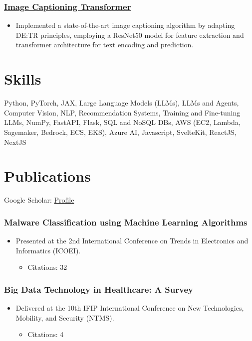 \documentclass[11pt,a4paper]{article}
\begin{document}
\subsubsection*{\href{https://github.com/vatsalsaglani/cocoImageCaptioningTransformer}{Image Captioning Transformer}}
\begin{itemize}
    \item Implemented a state-of-the-art image captioning algorithm by adapting DE:TR principles, employing a ResNet50 model for feature extraction and transformer architecture for text encoding and prediction.
\end{itemize}

\section*{Skills}
Python,
PyTorch, JAX, Large Language Models (LLMs),
LLMs and Agents,
Computer Vision,
NLP,
Recommendation Systems,
Training and Fine-tuning LLMs,
NumPy,
FastAPI,
Flask,
SQL and NoSQL DBs,
AWS (EC2, Lambda, Sagemaker, Bedrock, ECS, EKS),
Azure AI,
Javascript,
SvelteKit,
ReactJS,
NextJS


\section*{Publications}
\noindent Google Scholar: \href{https://scholar.google.com/citations?user=3RB_jh0AAAAJ&hl=en}{Profile}\\[0.5em]
\subsubsection*{Malware Classification using Machine Learning Algorithms}
\begin{itemize}
    \item Presented at the 2nd International Conference on Trends in Electronics and Informatics (ICOEI).
    \begin{itemize}
        \item Citations: 32
    \end{itemize}
\end{itemize}

\subsubsection*{Big Data Technology in Healthcare: A Survey}
\begin{itemize}
    \item Delivered at the 10th IFIP International Conference on New Technologies, Mobility, and Security (NTMS).
    \begin{itemize}
        \item Citations: 4
    \end{itemize}
\end{itemize}
\end{document}

